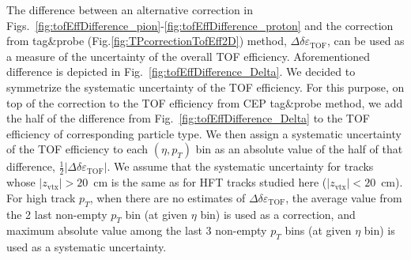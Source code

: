 The difference between an alternative correction in Figs.~\ref{fig:tofEffDifference_pion}-\ref{fig:tofEffDifference_proton} and the correction from tag\&probe (Fig.\ref{fig:TPcorrectionTofEff2D}) method, $\Delta\delta\varepsilon_{\text{TOF}}$, can be used as a measure of the uncertainty of the overall TOF efficiency. Aforementioned difference is depicted in Fig.~\ref{fig:tofEffDifference_Delta}. We decided to symmetrize the systematic uncertainty of the TOF efficiency. For this purpose, on top of the correction to the TOF efficiency from CEP tag\&probe method, we add the half of the difference from Fig.~\ref{fig:tofEffDifference_Delta} to the TOF efficiency of corresponding particle type. We then assign a systematic uncertainty of the TOF efficiency to each $(\eta,p_{T})$ bin as an absolute value of the half of that difference, $\frac{1}{2}|\Delta\delta\varepsilon_{\text{TOF}}|$. We assume that the systematic uncertainty for tracks whose $|z_{\text{vtx}}|>20$~cm is the same as for HFT tracks studied here ($|z_{\text{vtx}}|<20$~cm). For high track $p_{T}$, when there are no estimates of $\Delta\delta\varepsilon_{\text{TOF}}$, the average value from the 2 last non-empty $p_{T}$ bin (at given $\eta$ bin) is used as a correction, and maximum absolute value among the last 3 non-empty $p_{T}$ bins (at given $\eta$ bin) is used as a systematic uncertainty.

